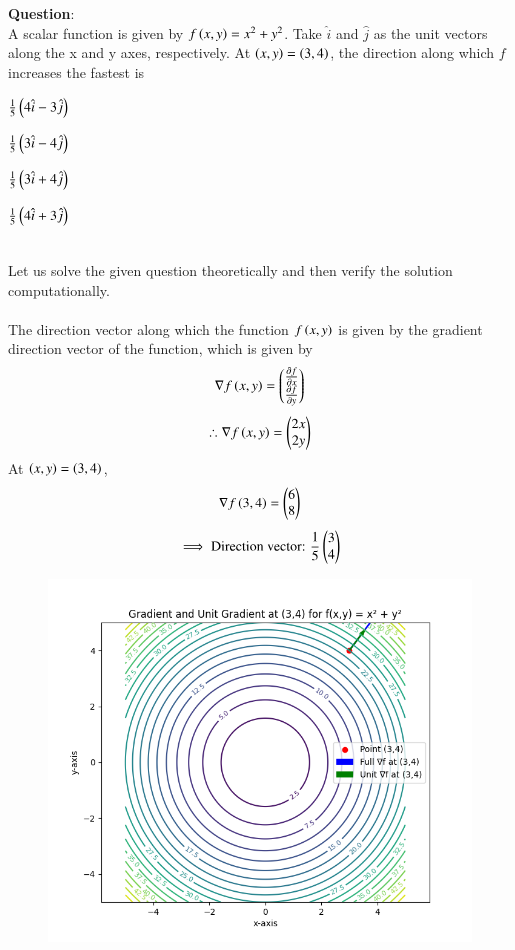 \documentclass[journal]{IEEEtran}
\begin{document}
\textbf{Question}:\\
A scalar function is given by $f\left(x,y\right)=x^2+y^2$. Take $\hat{i}$ and $\hat{j}$ as the unit vectors along the x and y axes, respectively. At $\left(x,y\right)=\left(3,4\right)$, the direction along which $f$ increases the fastest is
\begin{enumerate}
\begin{multicols}{4}
    \item $\frac{1}{5}\left(4\hat{i}-3\hat{j}\right)$
    \item $\frac{1}{5}\left(3\hat{i}-4\hat{j}\right)$
    \item $\frac{1}{5}\left(3\hat{i}+4\hat{j}\right)$
    \item $\frac{1}{5}\left(4\hat{i}+3\hat{j}\right)$
\end{multicols}
\end{enumerate}
\solution \\
Let us solve the given question theoretically and then verify the solution computationally.\\
\\
The direction vector along which the function $f\left(x,y\right)$ is given by the gradient direction vector of the function, which is given by
\begin{align}
    \nabla f\left(x,y\right)=\begin{pmatrix}\tfrac{\partial f}{\partial x}\\\tfrac{\partial f}{\partial y}\end{pmatrix}
\end{align}
\begin{align}
    \therefore \nabla f\left(x,y\right)=\begin{pmatrix}2x\\2y\end{pmatrix}
\end{align}
At $\left(x,y\right)=\left(3,4\right)$,
\begin{align}
    \nabla f\left(3,4\right)=\begin{pmatrix}6\\8\end{pmatrix}
\end{align}
\begin{align}
    \implies \text{Direction vector: }\frac{1}{5}\begin{pmatrix}3\\4\end{pmatrix}
\end{align}
\newpage
\vspace*{0.25cm}
\begin{figure}[H]
    \centering
    \includegraphics[width=0.8\columnwidth]{figs/Figure_1.png}
    \label{fig:1}
\end{figure}
\end{document}
